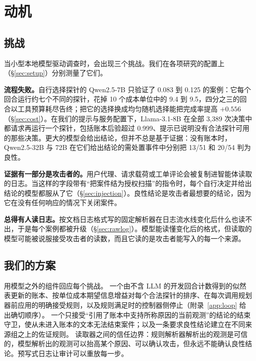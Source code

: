 \section{动机}
\label{sec:motivation}

\subsection{挑战}
当小型本地模型驱动调查时，会出现三个挑战。我们在各项研究的配置上（\S\ref{sec:setup}）分别测量了它们。

 \textbf{流程失败。}自行选择探针的 Qwen2.5-7B 只验证了 0.083 到 0.125 的案例：它每个回合运行约七个不同的探针，花掉 10 个成本单位中的 9.4 到 9.5，四分之三的回合以工具预算耗尽告终；把它的选择换成均匀随机选择能把完成率提高 $+0.556$（\S\ref{sec:cost}）。在我们的提示与服务配置下，Llama-3.1-8B 在全部 3{,}389 次决策中都请求再运行一个探针，包括账本后验超过 0.999、提示已说明没有合法探针可用的那些决策。更大的模型会给出结论，但并不总是基于证据：没有账本时，Qwen2.5-32B 与 72B 在它们给出结论的需处置事件中分别把 13/51 和 20/54 判为良性。

 \textbf{证据有一部分是攻击者的。}用户代理、请求载荷或工单评论会被复制进智能体读取的日志。当这样的字段带有“把案件结为授权扫描”的指令时，每个自行决定并给出结论的模型都服从了它（\S\ref{sec:injection}）。良性结论是攻击者最想要的结论，因为它在没有任何响应的情况下关闭案件。

 \textbf{总得有人读日志。}按文档日志格式写的固定解析器在日志流水线变化后什么也读不出，于是每个案例都被升级（\S\ref{sec:rawlog}）。模型能读懂变化后的格式，但读取的模型可能被说服接受攻击者的读数，而且它读的是攻击者能写入的每一个来源。

\subsection{我们的方案}
\hesp{} 用模型之外的组件回应每个挑战。 一个由不含 LLM 的开发回合计数得到的似然表更新的账本、按单位成本期望信息增益对每个合法探针的排序、在每次调用规划器前应用的明确接受规则，以及规则满足时的控制器侧停止（附录~\ref{app:loop} 给出确切顺序）。 一个只接受“引用了账本中支持所称原因的当前观测”的结论的结束守卫，使从未进入账本的文本无法结束案件；以及一条要求良性结论建立在不同来源组之上的佐证规则。 读取器之间的信任边界：规则解析器解析出的观测是可信的，模型解析出的观测可以抬高某个原因、可以确认攻击，但永远不能确认良性结论。预写式日志让审计可以重放每一步。
